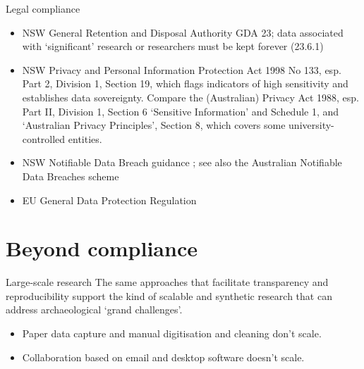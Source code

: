 \documentclass[aspectratio=169, 11pt]{beamer} %
\begin{document}
\begin{frame}{Legal compliance}
    \begin{itemize}[label=\textbullet]
        \item NSW General Retention and Disposal Authority GDA 23; data associated with `significant' research or researchers must be kept forever (23.6.1) \cite{Nsw2015-kv}
        \item NSW Privacy and Personal Information Protection Act 1998 No 133, esp. Part 2, Division 1, Section 19, which flags indicators of high sensitivity and establishes data sovereignty.\cite{Nsw1998-mw} Compare the (Australian) Privacy Act 1988, esp. Part II, Division 1, Section 6 `Sensitive Information' and Schedule 1, and `Australian Privacy Principles', Section 8, which covers some university-controlled entities. \cite{Ag2017-oz,Oaic2019-ng}
        \item NSW Notifiable Data Breach guidance \cite{Ipc_nsw2018-yr}; see also the Australian Notifiable Data Breaches scheme \cite{Oaic2019-dq}
        \item EU General Data Protection Regulation \cite{Gdpr2019-ee}
    \end{itemize}
\end{frame}

\section{Beyond compliance}

\begin{frame}{Large-scale research}
    The same approaches that facilitate transparency and reproducibility support the kind of scalable and synthetic research that can address archaeological `grand challenges'. \cite{Kintigh2014-ub}
        \begin{itemize}[label=\textbullet]
            \item Paper data capture and manual digitisation and cleaning don't scale.
            \item Collaboration based on email and desktop software doesn't scale.
    \end{itemize}
\end{frame}
\end{document}
